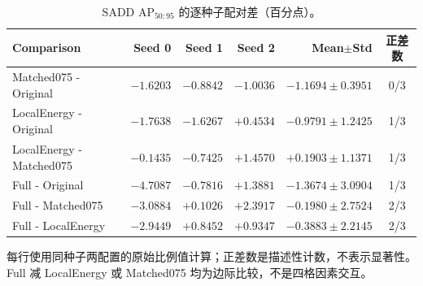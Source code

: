 \begin{table}[tp]
\centering\small
\setlength{\tabcolsep}{4pt}
\caption{SADD AP$_{50:95}$ 的逐种子配对差（百分点）。}\label{tab:sadd_paired}
\begin{tabular*}{\textwidth}{@{\extracolsep{\fill}}lrrrrc}
\toprule
Comparison & Seed 0 & Seed 1 & Seed 2 & Mean$\pm$Std & 正差数\\
\midrule
Matched075 - Original & $-1.6203$ & $-0.8842$ & $-1.0036$ & $-1.1694\pm0.3951$ & 0/3 \\
LocalEnergy - Original & $-1.7638$ & $-1.6267$ & $+0.4534$ & $-0.9791\pm1.2425$ & 1/3 \\
LocalEnergy - Matched075 & $-0.1435$ & $-0.7425$ & $+1.4570$ & $+0.1903\pm1.1371$ & 1/3 \\
Full - Original & $-4.7087$ & $-0.7816$ & $+1.3881$ & $-1.3674\pm3.0904$ & 1/3 \\
Full - Matched075 & $-3.0884$ & $+0.1026$ & $+2.3917$ & $-0.1980\pm2.7524$ & 2/3 \\
Full - LocalEnergy & $-2.9449$ & $+0.8452$ & $+0.9347$ & $-0.3883\pm2.2145$ & 2/3 \\
\bottomrule
\end{tabular*}
\smallskip
\begin{minipage}{\linewidth}\footnotesize
每行使用同种子两配置的原始比例值计算；正差数是描述性计数，不表示显著性。Full 减 LocalEnergy 或 Matched075 均为边际比较，不是四格因素交互。
\end{minipage}
\end{table}
